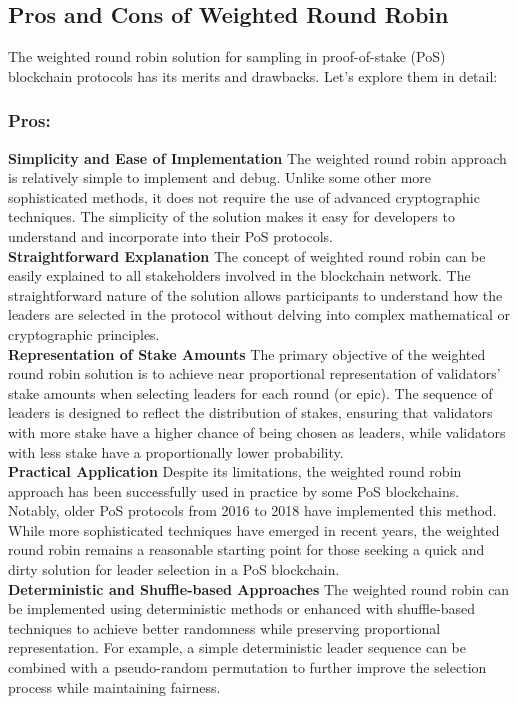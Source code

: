 \subsection{Pros and Cons of Weighted Round Robin}
The weighted round robin solution for sampling in proof-of-stake (PoS) blockchain protocols has its merits and drawbacks. Let's explore them in detail:

\subsubsection{Pros:}
\noindent
\textbf{Simplicity and Ease of Implementation}
The weighted round robin approach is relatively simple to implement and debug. Unlike some other more sophisticated methods, it does not require the use of advanced cryptographic techniques. The simplicity of the solution makes it easy for developers to understand and incorporate into their PoS protocols.\\

\noindent
\textbf{Straightforward Explanation}
The concept of weighted round robin can be easily explained to all stakeholders involved in the blockchain network. The straightforward nature of the solution allows participants to understand how the leaders are selected in the protocol without delving into complex mathematical or cryptographic principles.\\

\noindent
\textbf{Representation of Stake Amounts}
The primary objective of the weighted round robin solution is to achieve near proportional representation of validators' stake amounts when selecting leaders for each round (or epic). The sequence of leaders is designed to reflect the distribution of stakes, ensuring that validators with more stake have a higher chance of being chosen as leaders, while validators with less stake have a proportionally lower probability.\\

\noindent
\textbf{Practical Application}
Despite its limitations, the weighted round robin approach has been successfully used in practice by some PoS blockchains. Notably, older PoS protocols from 2016 to 2018 have implemented this method. While more sophisticated techniques have emerged in recent years, the weighted round robin remains a reasonable starting point for those seeking a quick and dirty solution for leader selection in a PoS blockchain.\\

\noindent
\textbf{Deterministic and Shuffle-based Approaches}
The weighted round robin can be implemented using deterministic methods or enhanced with shuffle-based techniques to achieve better randomness while preserving proportional representation. For example, a simple deterministic leader sequence can be combined with a pseudo-random permutation to further improve the selection process while maintaining fairness.\\

